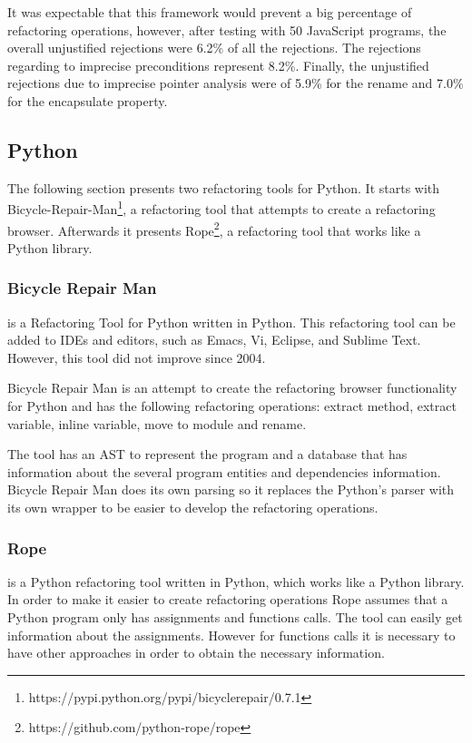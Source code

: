 It was expectable that this framework would prevent a big percentage of refactoring operations, however, after testing with 50 JavaScript programs, the overall unjustified rejections were 6.2\% of all the rejections. 
The rejections regarding to imprecise preconditions represent 8.2\%.
Finally, the unjustified rejections due to imprecise pointer analysis were of 5.9\% for the rename and 7.0\% for the encapsulate property. 


\subsection{Python}

The following section presents two refactoring tools for Python. 
It starts with Bicycle-Repair-Man\footnote{https://pypi.python.org/pypi/bicyclerepair/0.7.1}, a refactoring tool that attempts to create a refactoring browser. 
Afterwards it presents Rope\footnote{https://github.com/python-rope/rope}, a refactoring tool that works like a Python library.

\subsubsection{Bicycle Repair Man}

 is a Refactoring Tool for Python written in Python.
 This refactoring tool can be added to IDEs and editors, such as Emacs, Vi, Eclipse, and Sublime Text. However, this tool did not improve since 2004.

Bicycle Repair Man is an attempt to create the refactoring browser functionality for Python and has the following refactoring operations: extract method, extract variable, inline variable, move to module and rename.

The tool has an AST to represent the program and a database that has information about the several program entities and dependencies information.
Bicycle Repair Man does its own parsing so it replaces the Python's parser with its own wrapper to be easier to develop the refactoring operations.



\subsubsection{Rope}

 is a Python refactoring tool written in Python, which works like a Python library.
In order to make it easier to create refactoring operations Rope assumes that a Python program only has assignments and functions calls. %
The tool can easily get information about the assignments. 
However for functions calls it is necessary to have other approaches in order to obtain the necessary information. 

